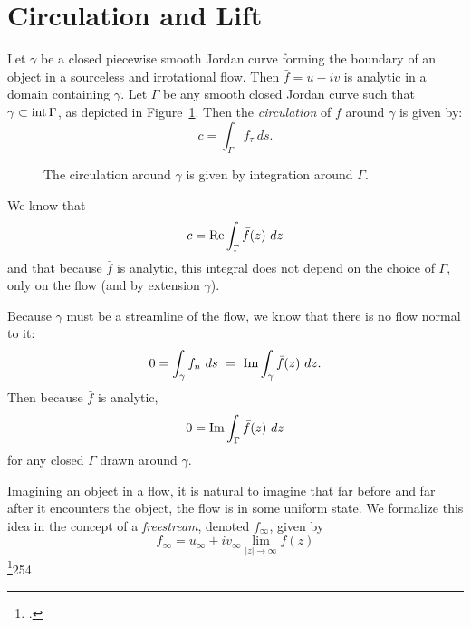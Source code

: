 \documentclass[letterpaper, twoside, 12 pt]{article}
\begin{document}
\section{Circulation and Lift} %
\label{sec:circulation_and_lift}

	\begin{definition}[Circulation]
		Let $\gamma$ be a closed piecewise smooth Jordan curve forming the boundary of an object in a sourceless and irrotational flow. 
		Then $\bar f  = u - iv$ is analytic in a domain containing $\gamma$.
		Let $\Gamma$ be any smooth closed Jordan curve such that $\gamma \subset \intr \Gamma$, as depicted in Figure~\ref{fig:circulation}.
		Then the \textit{circulation} of $f$ around $\gamma$ is given by:
		\[
			c = \int_\Gamma f_\tau \ ds.
		\]
	\end{definition}
	\begin{figure}[H]
		\centering
		\begin{tikzpicture}
			
		\end{tikzpicture}
		\captionsetup{width = 0.5 \textwidth}
		\caption{
			The circulation around $\gamma$ is given by integration around $\Gamma$.
		}
		\label{fig:circulation}
	\end{figure}

	\begin{remark}
		We know that 
		\[
			c = \re \int_\Gamma \bar f(z) \ dz
		\]
		and that because $\bar f$ is analytic, this integral does not depend on the choice of $\Gamma$, only on the flow (and by extension $\gamma$).

		Because $\gamma$ must be a streamline of the flow, we know that there is no flow normal to it:
		\[
			0 = \int_\gamma f_n \ ds \ = \ \im \int_\gamma \bar f(z) \ dz.
		\]
		Then because $\bar f$ is analytic, 
		\[
			0 = \im \int_\Gamma \bar f (z)\ dz
		\]
		for any closed $\Gamma$ drawn around $\gamma$.
	\end{remark}

	\begin{definition}[Freestream]
		Imagining an object in a flow, it is natural to imagine that far before and far after it encounters the object, the flow is in some uniform state.
		We formalize this idea in the concept of a \textit{freestream}, denoted $f_\infty$, given by
		\[
			f_\infty = u_\infty + i v_\infty \lim_{|z| \to \infty} f(z)
		\]
		\footcite{fisher}{254}
	\end{definition}
\end{document}
